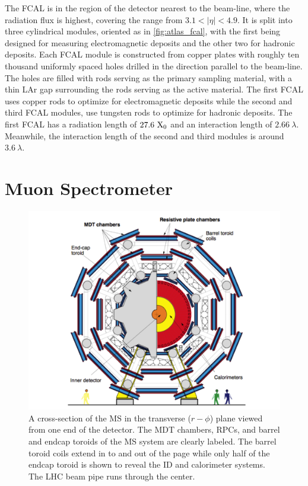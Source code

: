 The FCAL is in the region of the detector nearest to the beam-line, 
where the radiation flux is highest, covering the range
from $3.1 < |\eta| < 4.9$. It is split into three cylindrical modules,
oriented as in \fig\ref{fig:atlas_fcal}, with the first 
being designed for measuring electromagnetic deposits and the other
two for hadronic deposits.
Each FCAL module is constructed from copper plates with roughly ten thousand
uniformly spaced holes drilled in the direction parallel to the beam-line.
The holes are filled with rods serving as the primary sampling material, 
with a thin LAr gap surrounding the rods serving as the active material.
The first FCAL uses copper rods to optimize for electromagnetic deposits
while the second and third FCAL modules, use tungsten rods
to optimize for hadronic deposits.
The first FCAL has a radiation length of $27.6~\textrm{X}_0$ and an 
interaction length of $2.66~\lambda$. Meanwhile, the interaction
length of the second and third modules is around $3.6~\lambda$.







\section{Muon Spectrometer}
\label{sec:atlas_ms}

\begin{figure}[ht]
\centering
\includegraphics[width=.8\textwidth]{figures/atlas/ms_rphi}
\caption{A cross-section of the MS in the 
transverse ($r-\phi$) plane viewed from one end of the detector. 
The MDT chambers, RPCs, and
barrel and endcap toroids of the MS system are clearly labeled.
The barrel toroid coils extend in to and out of the page while only
half of the endcap toroid is shown to reveal the ID and calorimeter
systems.  The LHC beam pipe runs through the center.}
\label{fig:atlas_ms_rphi}
\end{figure}

